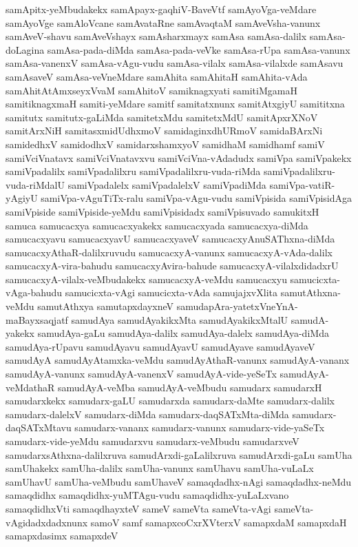 {samApitx-yeMbudakekx
samApayx-gaqhiV-BaveVtf
samAyoVga-veMdare
samAyoVge
samAloVcane
samAvataRne
samAvaqtaM
samAveVsha-vanunx
samAveV-shavu
samAveVshayx
samAsharxmayx
samAsa
samAsa-dalilx
samAsa-doLagina
samAsa-pada-diMda
samAsa-pada-veVke
samAsa-rUpa
samAsa-vanunx
samAsa-vanenxV
samAsa-vAgu-vudu
samAsa-vilalx
samAsa-vilalxde
samAsavu
samAsaveV
samAsa-veVneMdare
samAhita
samAhitaH
samAhita-vAda
samAhitAtAmxseyxVvaM
samAhitoV
samiknagxyati
samitiMgamaH
samitiknagxmaH
samiti-yeMdare
samitf
samitatxnunx
samitAtxgiyU
samititxna
samitutx
samitutx-gaLiMda
samitetxMdu
samitetxMdU
samitApxrXNoV
samitArxNiH
samitasxmidUdhxmoV
samidaginxdhURmoV
samidaBArxNi
samidedhxV
samidodhxV
samidarxshamxyoV
samidhaM
samidhamf
samiV
samiVciVnatavx
samiVciVnatavxvu
samiVciVna-vAdadudx
samiVpa
samiVpakekx
samiVpadalilx
samiVpadalilxru
samiVpadalilxru-vuda-riMda
samiVpadalilxru-vuda-riMdalU
samiVpadalelx
samiVpadalelxV
samiVpadiMda
samiVpa-vatiR-yAgiyU
samiVpa-vAguTiTx-ralu
samiVpa-vAgu-vudu
samiVpisida
samiVpisidAga
samiVpiside
samiVpiside-yeMdu
samiVpisidadx
samiVpisuvado
samukitxH
samuca
samucacxya
samucacxyakekx
samucacxyada
samucacxya-diMda
samucacxyavu
samucacxyavU
samucacxyaveV
samucacxyAnuSAThxna-diMda
samucacxyAthaR-dalilxruvudu
samucacxyA-vanunx
samucacxyA-vAda-dalilx
samucacxyA-vira-bahudu
samucacxyAvira-bahude
samucacxyA-vilalxdidadxrU
samucacxyA-vilalx-veMbudakekx
samucacxyA-veMdu
samucacxyu
samucicxta-vAga-bahudu
samucicxta-vAgi
samucicxta-vAda
samujajxvXlita
samutAthxna-veMdu
samutAthxya
samutapxdayxneV
samudapAra-yatetxVneYnA-maBayxsaqjatf
samudAya
samudAyakikxMta
samudAyakikxMtalU
samudA-yakekx
samudAya-gaLu
samudAya-dalilx
samudAya-dalelx
samudAya-diMda
samudAya-rUpavu
samudAyavu
samudAyavU
samudAyave
samudAyaveV
samudAyA
samudAyAtamxka-veMdu
samudAyAthaR-vanunx
samudAyA-vananx
samudAyA-vanunx
samudAyA-vanenxV
samudAyA-vide-yeSeTx
samudAyA-veMdathaR
samudAyA-veMba
samudAyA-veMbudu
samudarx
samudarxH
samudarxkekx
samudarx-gaLU
samudarxda
samudarx-daMte
samudarx-dalilx
samudarx-dalelxV
samudarx-diMda
samudarx-daqSATxMta-diMda
samudarx-daqSATxMtavu
samudarx-vananx
samudarx-vanunx
samudarx-vide-yaSeTx
samudarx-vide-yeMdu
samudarxvu
samudarx-veMbudu
samudarxveV
samudarxsAthxna-dalilxruva
samudArxdi-gaLalilxruva
samudArxdi-gaLu
samUha
samUhakekx
samUha-dalilx
samUha-vanunx
samUhavu
samUha-vuLaLx
samUhavU
samUha-veMbudu
samUhaveV
samaqdadhx-nAgi
samaqdadhx-neMdu
samaqdidhx
samaqdidhx-yuMTAgu-vudu
samaqdidhx-yuLaLxvano
samaqdidhxVti
samaqdhayxteV
sameV
sameVta
sameVta-vAgi
sameVta-vAgidadxdadxnunx
samoV
samf
samapxcoCxrXVterxV
samapxdaM
samapxdaH
samapxdasimx
samapxdeV
}
